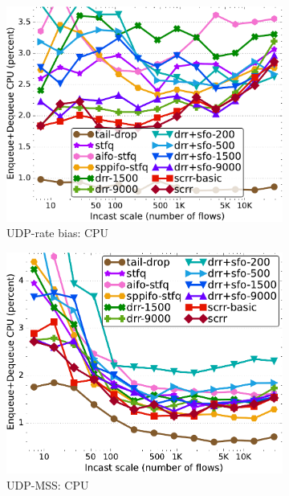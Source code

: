 \begin{figure}[th!]
\begin{subfigure}[t]{.30\linewidth}
    \includegraphics[width=0.95\linewidth]{figs/paral_cn_6u4x1024_Cb_7G_kp_comp_methods.pdf}
    \caption{UDP-rate bias: CPU}
    \label{fig:fairness-cpu-udp-rate-full}
  \end{subfigure}
  \begin{subfigure}[t]{.30\linewidth}
    \centering
    \includegraphics[width=0.95\linewidth]{figs/paral_cn_6u4x1024_mss_2500_kp_comp_methods.pdf}
    \caption{UDP-MSS: CPU}
    \label{fig:fairness-cpu-udp-mss-full}
  \end{subfigure}
  \begin{subfigure}[t]{.30\linewidth}
    \centering

\end{subfigure}
\end{figure}
